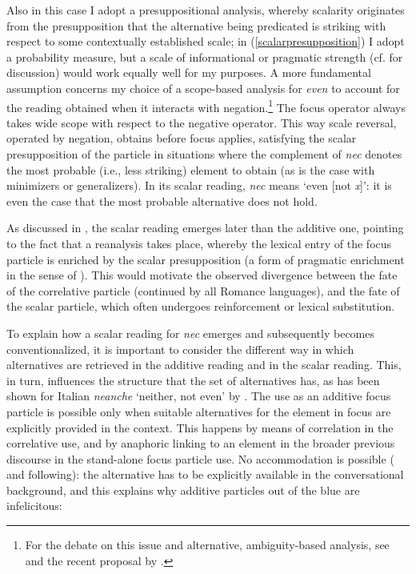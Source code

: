 \documentclass[output=paper,modfonts,nonflat,citecolor=brown,
showindex
]{langsci/langscibook}
\begin{document}
\noindent Also in this case I adopt a presuppositional analysis, whereby scalarity originates from the presupposition that the alternative being predicated is striking with respect to some contextually established scale; in (\ref{scalarpresupposition}) I adopt a probability measure, but a scale of informational or pragmatic strength (cf. \citealt{GastAuwera11} for discussion) would work equally well for my purposes. A more fundamental assumption concerns my choice of a scope-based analysis for {\emph{even}} to account for the reading obtained when it interacts with negation.{\footnote{For the debate on this issue and alternative, ambiguity-based analysis, see \citet[]{Rooth85} and the recent proposal by \citet[]{Collins16}.}} The focus operator always takes wide scope with respect to the negative operator. This way scale reversal, operated by negation, obtains before focus applies, satisfying the scalar presupposition of the particle in situations where the complement of {\emph{nec}} denotes the most probable (i.e., less striking) element to obtain (as is the case with minimizers or generalizers). In its scalar reading, {\emph{nec}} means `even [not {\emph{x}}]': it is even the case that the most probable alternative does not hold.

As discussed in , the scalar reading emerges later than the additive one, pointing to the fact that a reanalysis takes place, whereby the lexical entry of the focus particle is enriched by the scalar presupposition (a form of pragmatic enrichment in the sense of \citealt{TraugottDasher02}). This would motivate the observed divergence between the fate of the correlative particle (continued by all Romance languages), and the fate of the scalar particle, which often undergoes reinforcement or lexical substitution.

To explain how a scalar reading for {\emph{nec}} emerges and subsequently becomes conventionalized, it is important to consider the different way in which alternatives are retrieved in the additive reading and in the scalar reading. This, in turn, influences the structure that the set of alternatives has, as has been shown for Italian {\emph{neanche}} `neither, not even' by \citet{Tovena06}. The use as an additive focus particle is possible only when suitable alternatives for the element in focus are explicitly provided in the context. This happens by means of correlation in the correlative use, and by anaphoric linking to an element in the broader previous discourse in the stand-alone focus particle use. No accommodation is possible (\citealt[]{Zeevat92} and following): the alternative has to be explicitly available in the conversational background, and this explains why additive particles out of the blue are infelicitous:
\end{document}
